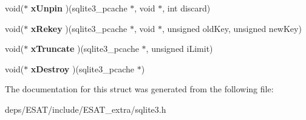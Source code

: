\begin{DoxyCompactItemize}
void($\ast$ {\bfseries x\+Unpin} )(sqlite3\+\_\+pcache $\ast$, void $\ast$, int discard)
\item 
\mbox{\label{structsqlite3__pcache__methods_a0d8a7a980e22e908429a181f8fc7733e}} 
void($\ast$ {\bfseries x\+Rekey} )(sqlite3\+\_\+pcache $\ast$, void $\ast$, unsigned old\+Key, unsigned new\+Key)
\item 
\mbox{\label{structsqlite3__pcache__methods_adc097defb1e83c6442fc0d47ac79cec9}} 
void($\ast$ {\bfseries x\+Truncate} )(sqlite3\+\_\+pcache $\ast$, unsigned i\+Limit)
\item 
\mbox{\label{structsqlite3__pcache__methods_ac775533f86db1d15bf7e4ded0e037eaf}} 
void($\ast$ {\bfseries x\+Destroy} )(sqlite3\+\_\+pcache $\ast$)
\end{DoxyCompactItemize}


The documentation for this struct was generated from the following file\+:\begin{DoxyCompactItemize}
\item 
deps/\+E\+S\+A\+T/include/\+E\+S\+A\+T\+\_\+extra/sqlite3.\+h\end{DoxyCompactItemize}
